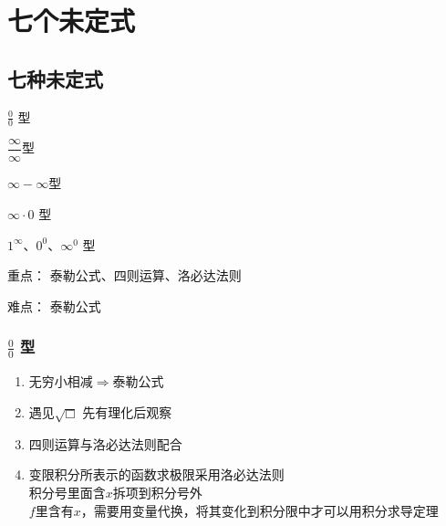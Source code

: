 \section{七个未定式}

\subsection{七种未定式}

\begin{LearnningObjectivesBox}[4]
	\begin{learningtargets}
		\item $\frac{0}{0}$ 型
		\item {\small $\dfrac{\infty}{\infty}$}型
		\item {\small ${\infty}-{\infty}$}型
		\item  ${\infty}\cdot{0}$ 型
		\item $1^{\infty} 、0^0 、{\infty^0} $ 型
	\end{learningtargets}
\end{LearnningObjectivesBox}
\begin{KeyandDifficultyBox}[4]
	\begin{learningkeys}
		\item[重点：] 泰勒公式、四则运算、洛必达法则
		\item[难点：] 泰勒公式
	\end{learningkeys}
\end{KeyandDifficultyBox}

\subsubsection{$\frac{0}{0}$ 型}
	\begin{enumerate}
		\item 无穷小相减$\Rightarrow$泰勒公式
		\item 遇见$\sqrt{\Box}$ 先有理化后观察
		\item 四则运算与洛必达法则配合
		\item 变限积分所表示的函数求极限采用洛必达法则\\
			 积分号里面含$x$拆项到积分号外\\
			 $f$里含有$x$，需要用变量代换，将其变化到积分限中才可以用积分求导定理
	\end{enumerate}


